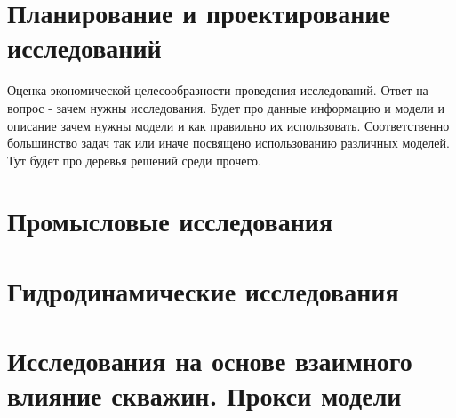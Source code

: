 \documentclass{memoir}
\begin{document}
\chapter{Планирование и проектирование исследований}

Оценка экономической целесообразности проведения исследований. Ответ на вопрос - зачем нужны исследования. 
Будет про данные информацию и модели и описание зачем нужны модели и как правильно их использовать.
Соответственно большинство задач так или иначе посвящено использованию различных моделей. 
Тут будет про деревья решений среди прочего.





\chapter{Промысловые исследования}









\chapter{Гидродинамические исследования}









\chapter{Исследования на основе взаимного влияние скважин. Прокси модели}









\printbibliography
\end{document}
